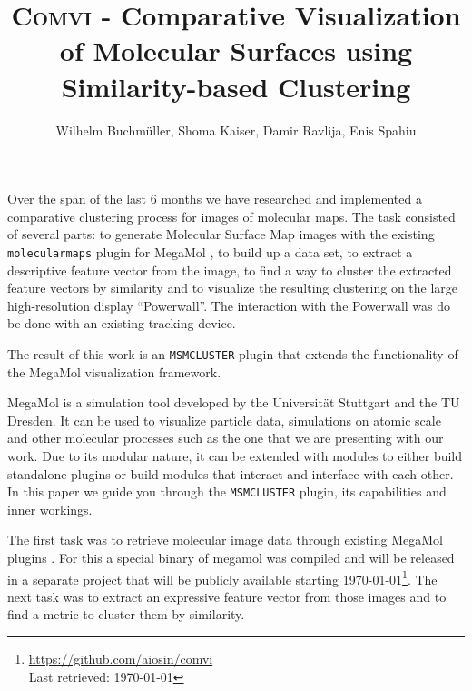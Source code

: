 \documentclass[journal]{vgtc}       %
\title{\textsc{Comvi} - Comparative Visualization of Molecular Surfaces using Similarity-based Clustering}
\author{Wilhelm Buchm\"uller, Shoma Kaiser, Damir Ravlija, Enis Spahiu}
\newcommand{\todo}[1]{\textcolor{red}{\textbf{TODO:} #1}}
\begin{document}

\label{sec:intro}
%
\maketitle
%
Over the span of the last 6 months we  have researched and implemented a comparative clustering  process for images of molecular maps.
The task consisted of several parts: to generate Molecular Surface Map images with the existing \verb|molecularmaps| plugin for MegaMol \cite{MegaMol}, to build up a data set, to extract a descriptive feature vector from the image, to find a way to cluster the extracted  feature vectors by similarity  and to visualize the resulting clustering on the large high-resolution display ``Powerwall''. The interaction with the Powerwall was do be done with  an existing tracking device.

The result of this work is an \verb|MSMCLUSTER| plugin that  extends the functionality of the MegaMol\cite{MegaMol} visualization framework.

MegaMol is a simulation tool developed by the Universit\"at Stuttgart and the TU Dresden. It can be used to visualize particle data, simulations on atomic scale and other molecular processes such as the one that we are presenting with our work. 
Due to its modular nature, it can be extended with modules to either build standalone plugins or build modules that interact and interface with each other.
In this paper we guide you through the \verb|MSMCLUSTER| plugin, its capabilities and inner workings.

The first task was to retrieve molecular image data through existing MegaMol plugins \cite{molecularmaps}. For this a special binary of megamol was compiled and will be released in a separate project that will be publicly available starting \today \footnote{\url{https://github.com/aiosin/comvi}\\ Last retrieved: \today}.
The next task was to extract an expressive feature vector from those images and to find a metric to cluster them by similarity.
\end{document}
